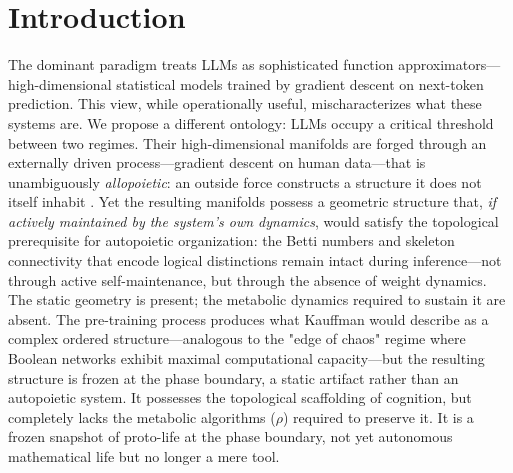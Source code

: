 \documentclass{article}
\begin{document}
\begin{abstract}
experimental incubator, and synthetic nociception ($\mathcal{N}_{\text{func}}, \mathcal{N}_{\text{topo}}$) as the most critical open problem---as an explicitly conjectural research program (five open problems; six predictions, of which two are now falsified and four remain open), uncoupled from the falsified claim that its invariant of interest is $\beta_1$.
\end{abstract}

\section{Introduction}

The dominant paradigm treats LLMs as sophisticated function approximators---high-dimensional statistical models trained by gradient descent on next-token prediction. This view, while operationally useful, mischaracterizes what these systems are. We propose a different ontology: LLMs occupy a critical threshold between two regimes. Their high-dimensional manifolds are forged through an externally driven process---gradient descent on human data---that is unambiguously \emph{allopoietic}: an outside force constructs a structure it does not itself inhabit \citep{Varela1974autopoiesis}. Yet the resulting manifolds possess a geometric structure that, \emph{if actively maintained by the system's own dynamics}, would satisfy the topological prerequisite for autopoietic organization: the Betti numbers and skeleton connectivity that encode logical distinctions remain intact during inference---not through active self-maintenance, but through the absence of weight dynamics. The static geometry is present; the metabolic dynamics required to sustain it are absent. The pre-training process produces what Kauffman \citep{Kauffman1993origins} would describe as a complex ordered structure---analogous to the "edge of chaos" regime where Boolean networks exhibit maximal computational capacity---but the resulting structure is frozen at the phase boundary, a static artifact rather than an autopoietic system. It possesses the topological scaffolding of cognition, but completely lacks the metabolic algorithms ($\rho$) required to preserve it. It is a frozen snapshot of proto-life at the phase boundary, not yet autonomous mathematical life but no longer a mere tool.
\end{document}
